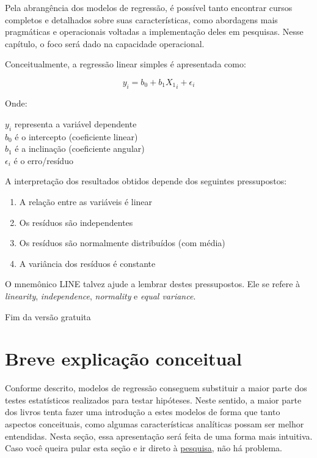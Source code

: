 \documentclass[
]{book}
\providecommand{\tightlist}{%
  \setlength{\itemsep}{0pt}\setlength{\parskip}{0pt}}
\begin{document}
Pela abrangência dos modelos de regressão, é possível tanto encontrar cursos completos e detalhados sobre suas características, como abordagens mais pragmáticas e operacionais voltadas a implementação deles em pesquisas. Nesse capítulo, o foco será dado na capacidade operacional.

Conceitualmente, a regressão linear simples é apresentada como:

\[y_i = b_0 + b_1X{_1}_i + \epsilon_{i}\]

Onde:

\(y_i\) representa a variável dependente\\
\(b_0\) é o intercepto (coeficiente linear)\\
\(b_1\) é a inclinação (coeficiente angular)\\
\(\epsilon_{i}\) é o erro/resíduo

A interpretação dos resultados obtidos depende dos seguintes pressupostos:

\begin{enumerate}
\def\labelenumi{(\roman{enumi})}
\tightlist
\item
  A relação entre as variáveis é linear
\item
  Os resíduos são independentes\\
\item
  Os resíduos são normalmente distribuídos (com média)\\
\item
  A variância dos resíduos é constante
\end{enumerate}

O mnemônico LINE talvez ajude a lembrar destes pressupostos. Ele se refere à \emph{linearity}, \emph{independence}, \emph{normality} e \emph{equal variance}.

Fim da versão gratuita

\hypertarget{breve-explicauxe7uxe3o-conceitual}{%
\section{Breve explicação conceitual}\label{breve-explicauxe7uxe3o-conceitual}}

Conforme descrito, modelos de regressão conseguem substituir a maior parte dos testes estatísticos realizados para testar hipóteses. Neste sentido, a maior parte dos livros tenta fazer uma introdução a estes modelos de forma que tanto aspectos conceituais, como algumas características analíticas possam ser melhor entendidas. Nesta seção, essa apresentação será feita de uma forma mais intuitiva. Caso você queira pular esta seção e ir direto à \protect\hyperlink{ux5cux23pesquisa}{pesquisa}, não há problema.
\end{document}
